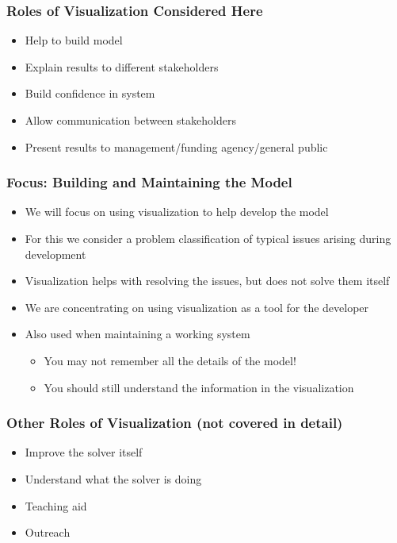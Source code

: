 \begin{frame}
\frametitle{Roles of Visualization Considered Here}
\begin{itemize}
\item Help to build model
\item Explain results to different stakeholders
\item Build confidence in system
\item Allow communication between stakeholders
\item Present results to management/funding agency/general public
\end{itemize}
\end{frame}

\begin{frame}
\frametitle{Focus: Building and Maintaining the Model}
\begin{itemize}
\item We will focus on using visualization to help develop the model
\item For this we consider a problem classification of typical issues arising during development
\item Visualization helps with resolving the issues, but does not solve them itself
\item We are concentrating on using visualization as a tool for the developer
\item Also used when maintaining a working system
\begin{itemize}
\item You may not remember all the details of the model!
\item You should still understand the information in the visualization
\end{itemize}
\end{itemize}
\end{frame}

\begin{frame}
\frametitle{Other Roles of Visualization (not covered in detail)}
\begin{itemize}
\item Improve the solver itself
\item Understand what the solver is doing
\item Teaching aid
\item Outreach
\end{itemize}
\end{frame}

